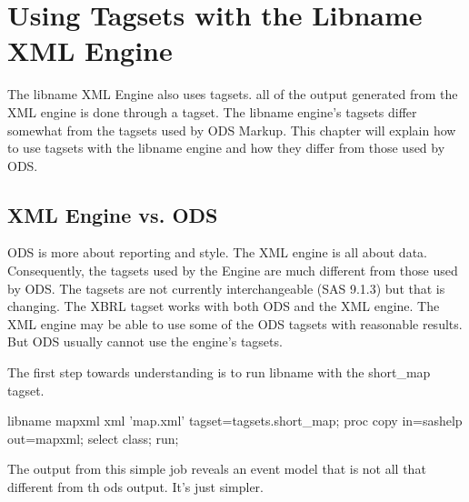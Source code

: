\chapter{Using Tagsets with the Libname XML Engine}
The libname XML Engine also uses tagsets.  all of the output generated
from the XML engine is done through a tagset.  The libname engine's 
tagsets differ somewhat from the tagsets used by ODS Markup.  This chapter
will explain how to use tagsets with the libname engine and how they
differ from those used by ODS.

\section{XML Engine vs. ODS}
ODS is more about reporting and
style.  The XML engine is all about data.  Consequently, the tagsets used by
the Engine are much different from those used by ODS.  The tagsets are not
currently interchangeable (SAS 9.1.3) but that is changing.  The XBRL tagset
works with both ODS and the XML engine.  The XML engine may be able to use 
some of the ODS tagsets with reasonable results.  But ODS usually cannot use 
the engine's tagsets.

The first step towards understanding is to run libname with the short\_map tagset.

\begin{sfvcode}
libname mapxml xml 'map.xml'
tagset=tagsets.short_map;
proc copy in=sashelp out=mapxml;
select class;
run;
\end{sfvcode}

The output from this simple job reveals an event model that is not all that
different from th  ods output.  It's just simpler.

